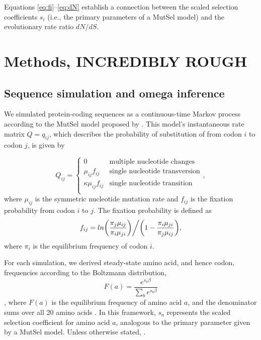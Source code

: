 \documentclass[11pt]{article}
\begin{document}
Equations \eqref{eq:fi}--\eqref{eq:dN} establish a connection between the scaled selection coefficients $s_i$ (i.e., the primary parameters of a MutSel model) and the evolutionary rate ratio $dN/dS$. 



\section*{Methods, INCREDIBLY ROUGH}

\subsection*{Sequence simulation and omega inference}
We simulated protein-coding sequences as a continuous-time Markov
process \cite{Yang2006} according to the MutSel model proposed by \cite{HalpernBruno1998}. This model's instantaneous rate matrix $Q = q_{ij}$, which describes the probability of substitution of from codon $i$ to codon $j$, is given by 

\begin{equation}
Q_{ij} = \left\{ \begin{array}{rl}
              0                                           &\mbox{multiple nucleotide changes} \\
              \mu_{ij}f_{ij}                          &\mbox{single nucleotide transversion} \\
              \kappa\mu_{ij}f_{ij}               &\mbox{single nucleotide transition} \\
         \end{array} \right.,
\end{equation} where $\mu_{ij}$ is the symmetric nucleotide mutation rate and $f_{ij}$ is the fixation probability from codon $i$ to $j$. The fixation probability is defined as \begin{equation}f_{ij} = ln\bigg{(}\frac{\pi_j\mu_{ij}}{\pi_i\mu_{ji}}\bigg{)}\bigg{/}\bigg{(}1 - \frac{\pi_i\mu_{ji}}{\pi_j\mu_{ij}}\bigg{)},\end{equation} where $\pi_i$ is the equilibrium frequency of codon $i$.

For each simulation, we derived steady-state amino acid, and hence codon, frequencies according to the Boltzmann distribution,
\begin{equation} F(a) = \frac{e^{s_a\beta}}{\sum_b e^{s_b\beta}} \end{equation}, where $F(a)$ is the equilibrium frequency of amino acid $a$, and the denominator sums over all 20 amino acids \cite{SellaHirsh2005, Ramseyetal2011}. In this framework, $s_a$ represents the scaled selection coefficient for amino acid $a$, analogous to the primary parameter given by a MutSel model. Unless otherwise stated, . 
  
\end{document}
